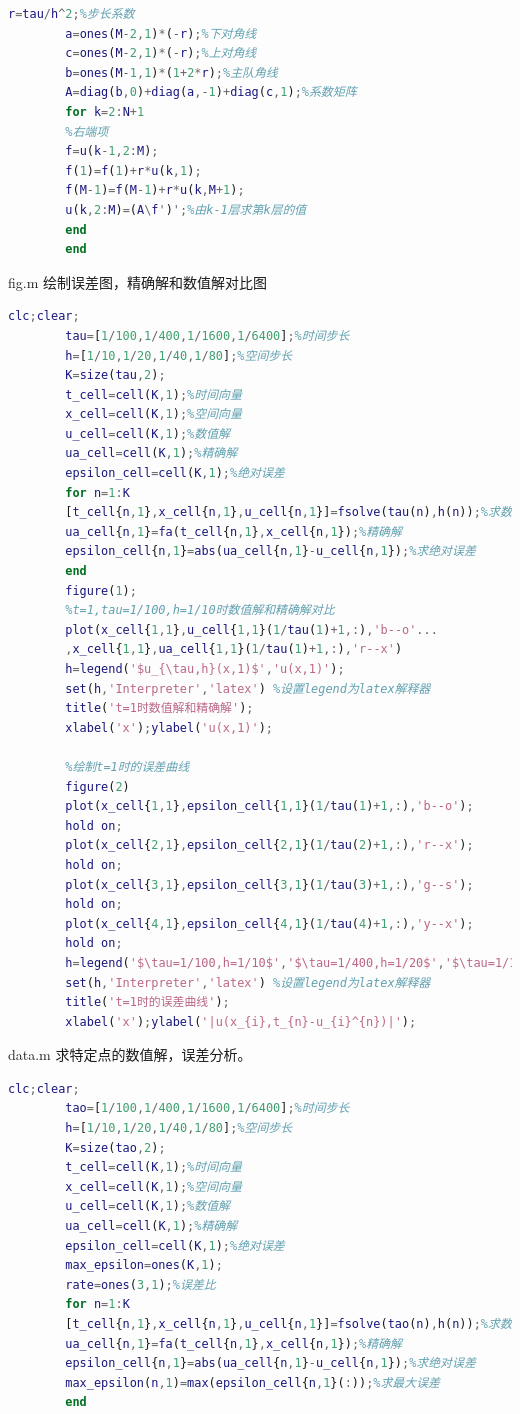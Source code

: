 \documentclass[withoutpreface,bwprint]{cumcmthesis} %
\begin{document}
\begin{appendices}
\begin{lstlisting}[language=matlab]
		r=tau/h^2;%步长系数
		a=ones(M-2,1)*(-r);%下对角线
		c=ones(M-2,1)*(-r);%上对角线
		b=ones(M-1,1)*(1+2*r);%主队角线
		A=diag(b,0)+diag(a,-1)+diag(c,1);%系数矩阵
		for k=2:N+1
		%右端项
		f=u(k-1,2:M);
		f(1)=f(1)+r*u(k,1);
		f(M-1)=f(M-1)+r*u(k,M+1);
		u(k,2:M)=(A\f')';%由k-1层求第k层的值
		end
		end
		\end{lstlisting}
		
		fig.m 绘制误差图，精确解和数值解对比图
		\begin{lstlisting}[language=matlab]
		clc;clear;
		tau=[1/100,1/400,1/1600,1/6400];%时间步长
		h=[1/10,1/20,1/40,1/80];%空间步长
		K=size(tau,2);
		t_cell=cell(K,1);%时间向量
		x_cell=cell(K,1);%空间向量
		u_cell=cell(K,1);%数值解
		ua_cell=cell(K,1);%精确解
		epsilon_cell=cell(K,1);%绝对误差
		for n=1:K
		[t_cell{n,1},x_cell{n,1},u_cell{n,1}]=fsolve(tau(n),h(n));%求数值解
		ua_cell{n,1}=fa(t_cell{n,1},x_cell{n,1});%精确解
		epsilon_cell{n,1}=abs(ua_cell{n,1}-u_cell{n,1});%求绝对误差
		end
		figure(1);
		%t=1,tau=1/100,h=1/10时数值解和精确解对比
		plot(x_cell{1,1},u_cell{1,1}(1/tau(1)+1,:),'b--o'...
		,x_cell{1,1},ua_cell{1,1}(1/tau(1)+1,:),'r--x')
		h=legend('$u_{\tau,h}(x,1)$','u(x,1)');
		set(h,'Interpreter','latex') %设置legend为latex解释器
		title('t=1时数值解和精确解');
		xlabel('x');ylabel('u(x,1)');
		
		%绘制t=1时的误差曲线
		figure(2)
		plot(x_cell{1,1},epsilon_cell{1,1}(1/tau(1)+1,:),'b--o');
		hold on;
		plot(x_cell{2,1},epsilon_cell{2,1}(1/tau(2)+1,:),'r--x');
		hold on;
		plot(x_cell{3,1},epsilon_cell{3,1}(1/tau(3)+1,:),'g--s');
		hold on;
		plot(x_cell{4,1},epsilon_cell{4,1}(1/tau(4)+1,:),'y--x');
		hold on;
		h=legend('$\tau=1/100,h=1/10$','$\tau=1/400,h=1/20$','$\tau=1/1600,h=1/40$','$\tau=1/6400,h=1/80$');
		set(h,'Interpreter','latex') %设置legend为latex解释器
		title('t=1时的误差曲线');
		xlabel('x');ylabel('|u(x_{i},t_{n}-u_{i}^{n})|');
		\end{lstlisting}
		
		data.m 求特定点的数值解，误差分析。
		\begin{lstlisting}[language=matlab]
		clc;clear;
		tao=[1/100,1/400,1/1600,1/6400];%时间步长
		h=[1/10,1/20,1/40,1/80];%空间步长
		K=size(tao,2);
		t_cell=cell(K,1);%时间向量
		x_cell=cell(K,1);%空间向量
		u_cell=cell(K,1);%数值解
		ua_cell=cell(K,1);%精确解
		epsilon_cell=cell(K,1);%绝对误差
		max_epsilon=ones(K,1);
		rate=ones(3,1);%误差比
		for n=1:K
		[t_cell{n,1},x_cell{n,1},u_cell{n,1}]=fsolve(tao(n),h(n));%求数值解
		ua_cell{n,1}=fa(t_cell{n,1},x_cell{n,1});%精确解
		epsilon_cell{n,1}=abs(ua_cell{n,1}-u_cell{n,1});%求绝对误差
		max_epsilon(n,1)=max(epsilon_cell{n,1}(:));%求最大误差
		end
		

\end{lstlisting}
\end{appendices}
\end{document}
